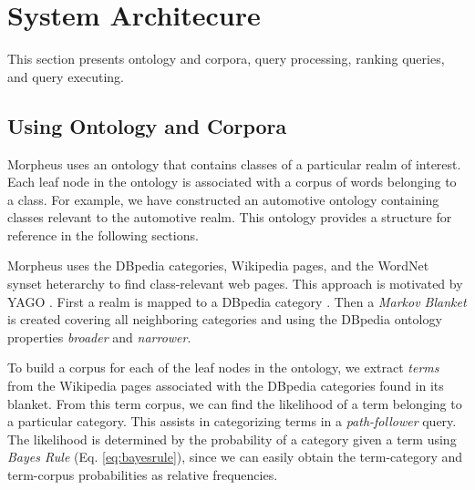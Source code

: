 \section{System Architecure}
\label{sec:systemarch}

This section presents ontology and corpora, query processing, ranking queries, and query executing.

\subsection{Using Ontology and Corpora} 
\label{sec:ontology_corpora}

Morpheus uses an ontology that contains classes of a particular realm of interest. Each leaf node in the ontology is associated with a corpus of words belonging to a class.  For example, we have constructed an automotive ontology containing classes relevant to the automotive realm. This ontology provides a structure for reference in the following sections.



Morpheus uses the DBpedia categories, Wikipedia pages, and the WordNet synset heterarchy to find class-relevant web pages. This approach is motivated by YAGO \cite{Suchanek2009phd}. First a realm is mapped to a DBpedia category \cite{Bizer2009}. Then a \emph{Markov Blanket} \cite{PRIS} is created covering all neighboring categories and using the DBpedia ontology properties \emph{broader} and \emph{narrower}.

To build a corpus for each of the leaf nodes in the ontology, we extract \emph{terms} from the Wikipedia pages associated with the DBpedia categories found in its blanket. From this term corpus, we can find the likelihood of a term belonging to a particular category. This assists in categorizing terms in a \emph{path-follower} query. The likelihood is determined by the probability of a category given a term using \textit{Bayes Rule} (Eq. \ref{eq:bayesrule}), since we can easily obtain the term-category and term-corpus probabilities as relative frequencies. 



